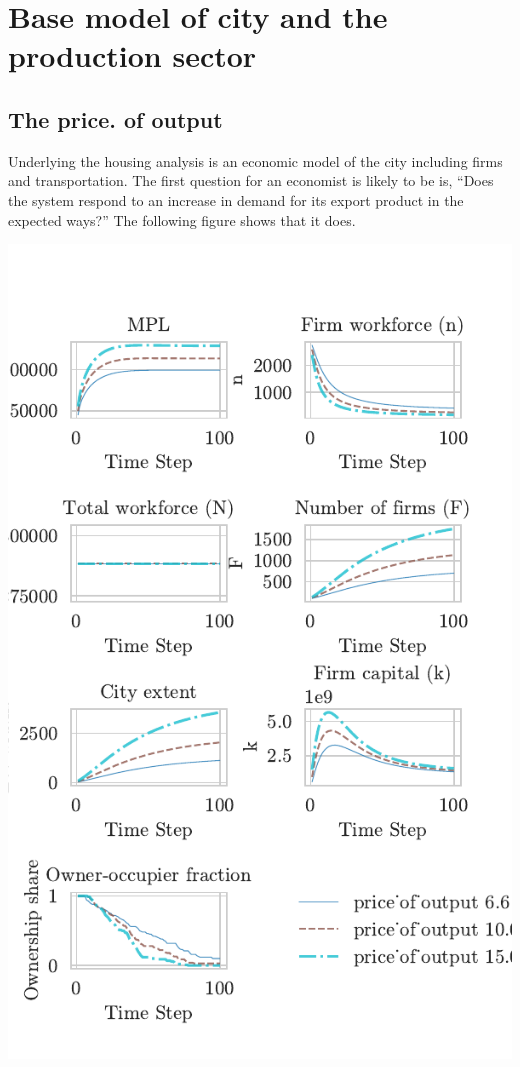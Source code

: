 \documentclass{article}
\begin{document}


\section{Base model of city and the production sector}
\newpage
 \subsection{The price. of output}
Underlying the housing analysis is an economic model of the city including firms and transportation.  The first question for an economist is likely to be is, ``Does the system respond to an increase in demand for its export product in the expected ways?'' The following figure shows that it does. 


\includegraphics[scale=1]{fig/Analysis/price3.pdf}
\end{document}

